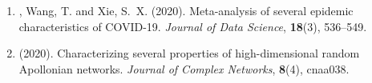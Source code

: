 \begin{enumerate}[resume=journalpubs]
\begin{pubentry}
\par\end{pubentry}
\item\begin{pubentry} \PZ{}, Wang, T. and Xie, S.\ X. (2020). Meta-analysis of several epidemic characteristics of COVID-19. \emph{Journal of Data Science}, \textbf{18}(3), 536--549.

\par\end{pubentry}
\item\begin{pubentry} \PZ{} (2020). Characterizing several properties of high-dimensional random Apollonian networks. \emph{Journal of Complex Networks}, \textbf{8}(4), cnaa038.
\par\end{pubentry}
\end{enumerate}
